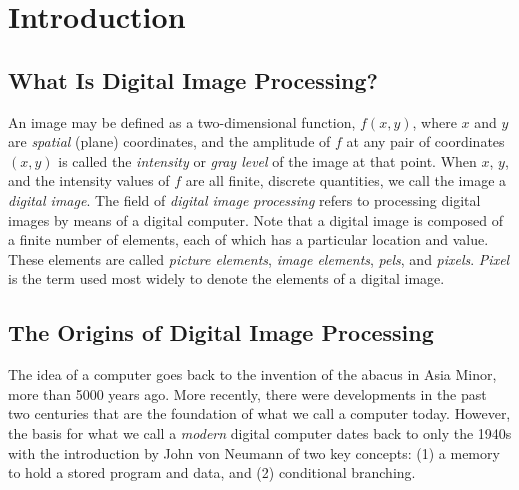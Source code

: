 \documentclass[a4paper,10pt,twoside]{book}
\begin{document}

\restoregeometry
\thispagestyle{empty}
\setcounter{page}{0}
\tableofcontents
\thispagestyle{empty}
\setcounter{page}{0}


\chapter{Introduction}
\section{What Is Digital Image Processing?}

An image may be defined as a two-dimensional function, $f(x,y)$, where $x$ and $y$ are \textit{spatial} (plane) coordinates, and the amplitude of $f$ at any pair of coordinates $(x,y)$ is called the \textit{intensity} or \textit{gray level} of the image at that point. When $x$, $y$, and the intensity values of $f$ are all finite, discrete quantities, we call the image a \textit{digital image}. The field of \textit{digital image processing} refers to processing digital images by means of a digital computer. Note that a digital image is composed of a finite number of elements, each of which has a particular location and value. These elements are called \textit{picture elements}, \textit{image elements}, \textit{pels}, and \textit{pixels}. \textit{Pixel} is the term used most widely to denote the elements of a digital image.

\section{The Origins of Digital Image Processing}

The idea of a computer goes back to the invention of the abacus in Asia Minor, more than 5000 years ago. More recently, there were developments in the past two centuries that are the foundation of what we call a computer today. However, the basis for what we call a \textit{modern} digital computer dates back to only the 1940s with the introduction by John von Neumann of two key concepts: (1) a memory to hold a stored program and data, and (2) conditional branching.
\end{document}
